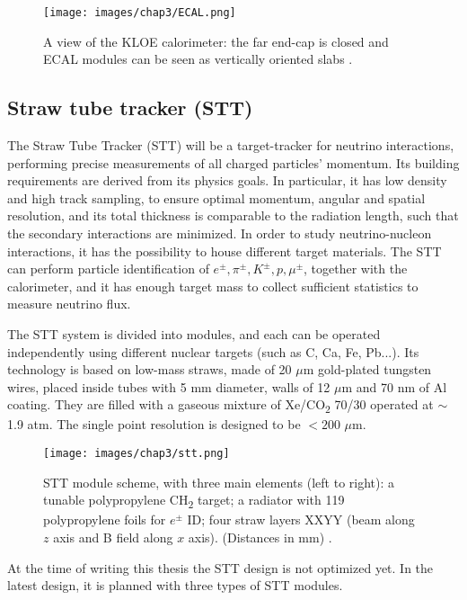 \begin{figure}
    \centering
    \texttt{[image: images/chap3/ECAL.png]}
    \caption{A view of the KLOE calorimeter: the far end-cap is closed and ECAL modules can be seen as vertically oriented slabs \cite{nd_cdr}.}
    \label{fig:ECAL}
\end{figure}

\subsection{Straw tube tracker (STT)}
The Straw Tube Tracker (STT) will be a target-tracker for neutrino interactions, performing precise measurements of all charged particles' momentum. Its building requirements are derived from its physics goals. In particular, it has low density and high track sampling, to ensure optimal momentum, angular and spatial resolution, and its total thickness is comparable to the radiation length, such that the secondary interactions are minimized. In order to study neutrino-nucleon interactions, it has the possibility to house different target materials. The STT can perform particle identification of $e^\pm, \pi^\pm, K^\pm, p, \mu^\pm$, together with the calorimeter, and it has enough target mass to collect sufficient statistics to measure neutrino flux. 

The STT system is divided into modules, and each can be operated independently using different nuclear targets (such as C, Ca, Fe, Pb...). Its technology is based on low-mass straws, made of 20 $\mu$m gold-plated tungsten wires, placed inside tubes with 5 mm diameter, walls of 12 $\mu$m and 70 nm of Al coating. They are filled with a gaseous mixture of Xe/CO\textsubscript{2} 70/30 operated at $\sim$ 1.9 atm. The single point resolution is designed to be $< 200$ $\mu$m.%

\begin{figure}[h!]
    \centering
    \texttt{[image: images/chap3/stt.png]}
    \caption{STT module scheme, with three main elements (left to right): a tunable polypropylene CH\textsubscript{2} target; a radiator with 119 polypropylene foils for $e^\pm$ ID; four straw layers XXYY (beam along $z$ axis and B field along $x$ axis). (Distances in mm) \cite{nd_cdr}.}
    \label{fig:STT1}
\end{figure}
At the time of writing this thesis the STT design is not optimized yet. In the latest design, it is planned with three types of STT modules.

